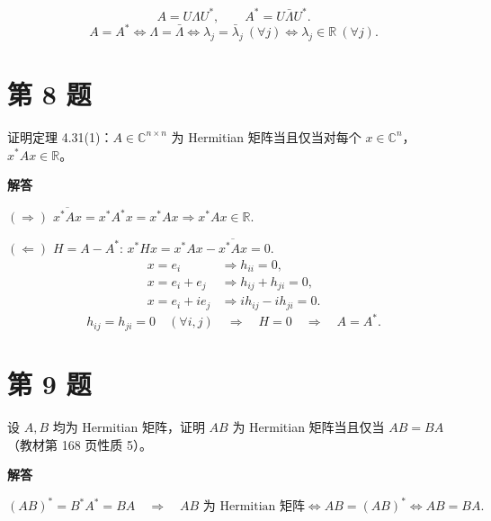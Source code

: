 \documentclass[UTF8,10pt,letterpaper,fontset=fandol]{ctexart}
\newcommand{\C}{\mathbb C}
\newcommand{\R}{\mathbb R}
\begin{document}
\[
 A=U\Lambda U^*,\qquad A^*=U\bar\Lambda U^*.
\]
\[
 \boxed{A=A^*\iff\Lambda=\bar\Lambda
 \iff\lambda_j=\bar\lambda_j\ (\forall j)\iff\lambda_j\in\R\ (\forall j)}.
\]
\section{第 8 题}
证明定理 4.31(1)：$A\in\C^{n\times n}$ 为 Hermitian 矩阵当且仅当对每个 $x\in\C^n$，$x^*Ax\in\R$。
\par{}\textbf{解答}\par

\textbf{$(\Rightarrow)$}\quad
 $\overline{x^*Ax}=x^*A^*x=x^*Ax\Longrightarrow x^*Ax\in\R$.

\textbf{$(\Leftarrow)$}\quad
 $H=A-A^*$:\quad
 $x^*Hx=x^*Ax-\overline{x^*Ax}=0$.
\begin{align*}
 x=e_i&\Longrightarrow h_{ii}=0,\\
 x=e_i+e_j&\Longrightarrow h_{ij}+h_{ji}=0,\\
 x=e_i+ie_j&\Longrightarrow ih_{ij}-ih_{ji}=0.
\end{align*}
\[
 h_{ij}=h_{ji}=0\quad(\forall i,j)\quad\Longrightarrow\quad H=0
 \quad\Longrightarrow\quad\boxed{A=A^*}.
\]
\section{第 9 题}
设 $A,B$ 均为 Hermitian 矩阵，证明 $AB$ 为 Hermitian 矩阵当且仅当 $AB=BA$（教材第 168 页性质 5）。
\par{}\textbf{解答}\par

\[
 (AB)^*=B^*A^*=BA
 \quad\Longrightarrow\quad
 \boxed{AB\text{ 为 Hermitian 矩阵}\iff AB=(AB)^*\iff AB=BA}.
\]
\end{document}
